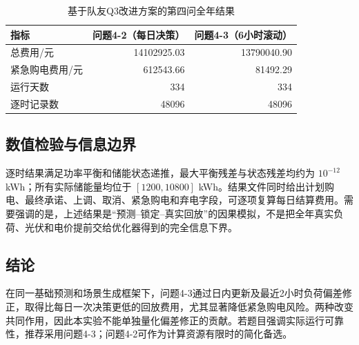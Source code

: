 \begin{table}[H]
\centering
\caption{基于队友Q3改进方案的第四问全年结果}
\label{tab:q4p1}
\begin{tabular}{lrr}
\toprule
指标 & 问题4-2（每日决策） & 问题4-3（6小时滚动）\\
\midrule
总费用/元 & 14102925.03 & 13790040.90\\
紧急购电费用/元 & 612543.66 & 81492.29\\
运行天数 & 334 & 334\\
逐时记录数 & 48096 & 48096\\
\bottomrule
\end{tabular}
\end{table}

\subsection{数值检验与信息边界}
逐时结果满足功率平衡和储能状态递推，最大平衡残差与状态残差均约为 $10^{-12}$ kWh；所有实际储能量均位于 $[1200,10800]$ kWh。结果文件同时给出计划购电、最终承诺、上调、取消、紧急购电和弃电字段，可逐项复算每日结算费用。需要强调的是，上述结果是“预测--锁定--真实回放”的因果模拟，不是把全年真实负荷、光伏和电价提前交给优化器得到的完全信息下界。

\subsection{结论}
在同一基础预测和场景生成框架下，问题4-3通过日内更新及最近2小时负荷偏差修正，取得比每日一次决策更低的回放费用，尤其显著降低紧急购电风险。两种改变共同作用，因此本实验不能单独量化偏差修正的贡献。若题目强调实际运行可靠性，推荐采用问题4-3；问题4-2可作为计算资源有限时的简化备选。
